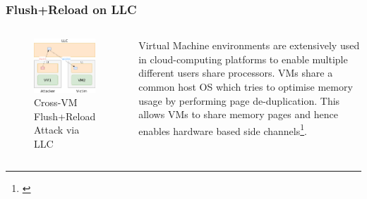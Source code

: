 \documentclass[10pt]{beamer}
\begin{document}
\begin{frame}
\frametitle{Flush+Reload on LLC}

\begin{columns}[c]
\begin{figure}
\includegraphics[width=\textwidth]{flush_reload_crossvm}
\caption{Cross-VM Flush+Reload Attack via LLC}
\end{figure}

Virtual Machine environments are extensively used in cloud-computing
platforms to enable multiple different users share processors. VMs share a common host OS
which tries to optimise memory usage by performing page de-duplication. This allows VMs
    to share memory pages and hence enables hardware based side channels\footnote[frame]{\cite{cross_vm}}.
\end{columns}
\end{frame}
\end{document}
